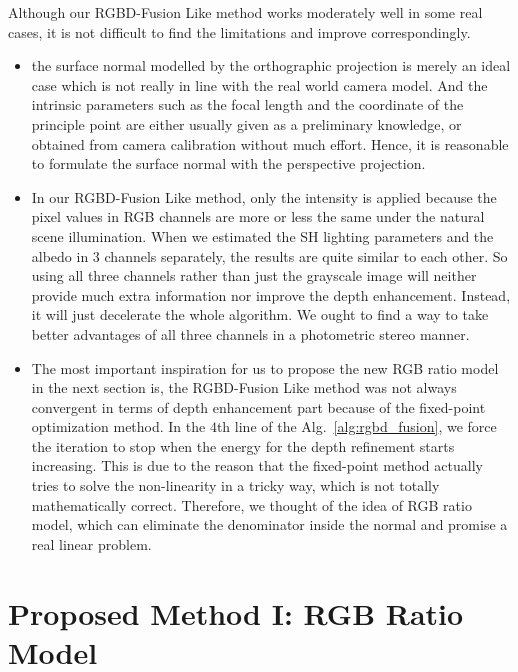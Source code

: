 Although our RGBD-Fusion Like method works moderately well in some real cases, it is not difficult to find the limitations and improve correspondingly.
\begin{itemize}
\item the surface normal modelled by the orthographic projection is merely an ideal case which is not really in line with the real world camera model.
And the intrinsic parameters such as the focal length and the coordinate of the principle point are either usually given as a preliminary knowledge, or obtained from camera calibration without much effort.
Hence, it is reasonable to formulate the surface normal with the perspective projection.

\item In our RGBD-Fusion Like method, only the intensity is applied because the pixel values in RGB channels are more or less the same under the natural scene illumination. 
When we estimated the SH lighting parameters and the albedo in 3 channels separately, the results are quite similar to each other.
So using all three channels rather than just the grayscale image will neither provide much extra information nor improve the depth enhancement. 
Instead, it will just decelerate the whole algorithm.
We ought to find a way to take better advantages of all three channels in a photometric stereo manner.

\item The most important inspiration for us to propose the new RGB ratio model in the next section is, the RGBD-Fusion Like method was not always convergent in terms of depth enhancement part because of the fixed-point optimization method.
In the $4$th line of the Alg.~\ref{alg:rgbd_fusion}, we force the iteration to stop when the energy for the depth refinement starts increasing.
This is due to the reason that the fixed-point method actually tries to solve the non-linearity in a tricky way, which is not totally mathematically correct. 
Therefore, we thought of the idea of RGB ratio model, which can eliminate the denominator inside the normal and promise a real linear problem.

\end{itemize}


\section{Proposed Method I: RGB Ratio Model}

